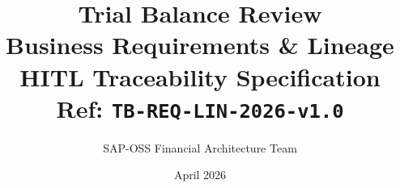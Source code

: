 \documentclass[11pt,a4paper,twoside]{report}
\begin{document}
\title{\Huge Trial Balance Review \\
       \textbf{Business Requirements \& Lineage} \\
       \large HITL Traceability Specification \\
       \small Ref: \texttt{TB-REQ-LIN-2026-v1.0}}
\author{SAP-OSS Financial Architecture Team}
\date{April 2026}

\maketitle



















\end{document}
